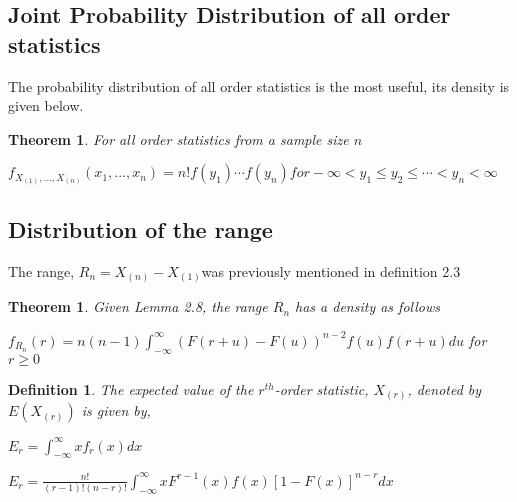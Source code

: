 \documentclass[11pt,a4paper]{article}
\theoremstyle{plain}
\newtheorem{thm}[fact]{Theorem}
\newtheorem{de}[fact]{Definition}
\begin{document}
\subsection*{Joint Probability Distribution of all order statistics}
The probability distribution of all order statistics is the most useful, its density is given below.

\begin{thm}
For all order statistics from a sample size $n$
\begin{center}

$f_{X_{(1)},...,X_{(n)}}(x_1,...,x_n) =n!f(y_1)\cdots f(y_n) for -\infty<y_1\leq y_2\leq \cdots <y_n<\infty $

\end{center}
\end{thm}

  
\subsection*{Distribution of the range}
The range, $R_n=X_{(n)}-X_{(1)}$was previously mentioned in definition 2.3

\begin{thm}
Given Lemma 2.8, the range $R_n$ has a density as follows
 \begin{center}
 $f_{R_n}(r)=n(n-1)\int_{-\infty}^{\infty} (F(r+u)-F(u))^{n-2}f(u)f(r+u)du$ for $r \geq 0$
\end{center}
\end{thm}



\begin{de}
The expected value of the $r^{th}$-order statistic, $X_{(r)}$, denoted by $E(X_{(r)})$ is given by,
\begin{center}
$E_r=\int^\infty_{-\infty} xf_r(x)dx$
\end{center}
\end{de}

\begin{center}
$E_r=\frac{n!}{(r-1)!(n-r)!}\int_{-\infty}^{\infty}xF^{r-1}(x)f(x)[1-F(x)]^{n-r}dx$
\end{center} 
\end{document}
